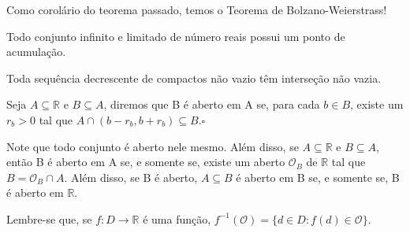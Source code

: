 \documentclass[analysis_notes.tex]{subfiles}
\begin{document}
Como corolário do teorema passado, temos o Teorema de Bolzano-Weierstrass!
\begin{crl*}
	Todo conjunto infinito e limitado de número reais possui um ponto de acumulação.
\end{crl*}
\begin{crl*}
	Toda sequência decrescente de compactos não vazio têm interseção não vazia.
\end{crl*}
\begin{def*}
	Seja $A\subseteq{\mathbb{R}}$ e $B\subseteq{A}$, diremos que B é aberto em A se, para cada $b\in B$, existe um $r_{b}>0$ tal
	que $A\cap (b-r_{b}, b + r_{b})\subseteq{B}.\square$
\end{def*}
Note que todo conjunto é aberto nele mesmo. Além disso, se $A\subseteq{\mathbb{R}}$ e $B\subseteq{A}$, então B é aberto em A
se, e somente se, existe um aberto $\mathcal{O}_{B}$ de $\mathbb{R}$ tal que $B=\mathcal{O}_{B}\cap A.$ Além disso,
se B é aberto, $A\subseteq{B}$ é aberto em B se, e somente se, B é aberto em $\mathbb{R}.$

Lembre-se que, se $f:D\rightarrow \mathbb{R}$ é uma função, $f^{-1}(\mathcal{O})=\{d\in D: f(d)\in \mathcal{O}\}.$
\end{document}
